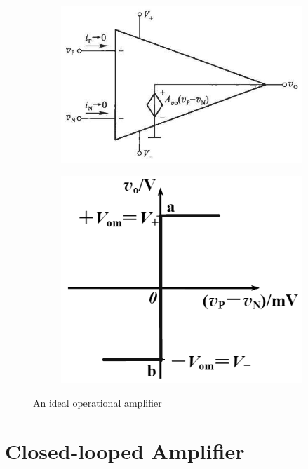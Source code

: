 \begin{figure}[H]
  \centering
  \begin{subfigure}{.6\textwidth}
    \centering
    \includegraphics[width=\linewidth]{figures/ideal-comparator}
  \end{subfigure}
  \begin{subfigure}{.35\textwidth}
    \centering
    \includegraphics[width=\linewidth]{figures/ideal-comparator-2}
  \end{subfigure}
  \caption{An ideal operational amplifier}
\end{figure}

\section{Closed-looped Amplifier}

